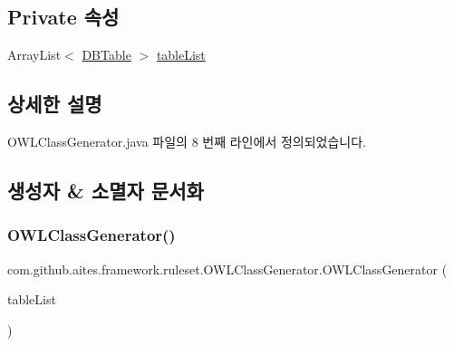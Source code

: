 \subsection*{Private 속성}
\begin{DoxyCompactItemize}
\item 
Array\+List$<$ \mbox{\hyperlink{classcom_1_1github_1_1aites_1_1framework_1_1dbcomponent_1_1_d_b_table}{D\+B\+Table}} $>$ \mbox{\hyperlink{classcom_1_1github_1_1aites_1_1framework_1_1ruleset_1_1_o_w_l_class_generator_a994d90ead25bc6713618ff0dbff19445}{table\+List}}
\end{DoxyCompactItemize}


\subsection{상세한 설명}


O\+W\+L\+Class\+Generator.\+java 파일의 8 번째 라인에서 정의되었습니다.



\subsection{생성자 \& 소멸자 문서화}
\mbox{\label{classcom_1_1github_1_1aites_1_1framework_1_1ruleset_1_1_o_w_l_class_generator_a3dc38422903dea3df10a67feac47b6f5}} 
\subsubsection{\texorpdfstring{O\+W\+L\+Class\+Generator()}{OWLClassGenerator()}}
{\footnotesize\ttfamily com.\+github.\+aites.\+framework.\+ruleset.\+O\+W\+L\+Class\+Generator.\+O\+W\+L\+Class\+Generator (\begin{DoxyParamCaption}\item[{Array\+List$<$ \mbox{\hyperlink{classcom_1_1github_1_1aites_1_1framework_1_1dbcomponent_1_1_d_b_table}{D\+B\+Table}} $>$}]{table\+List }\end{DoxyParamCaption})}




